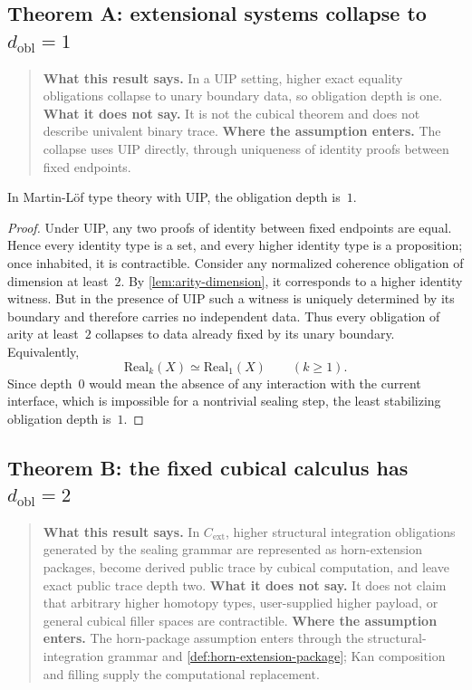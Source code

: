 \documentclass{lmcs}
\newcommand{\Real}{\mathrm{Real}}
\newcommand{\Cext}{C_{\mathrm{ext}}}
\begin{document}
\subsection{\texorpdfstring{Theorem A: extensional systems collapse to $d_{\mathrm{obl}}=1$}{Theorem A: extensional systems collapse to d obl = 1}}

\begin{quote}
\small
\textbf{What this result says.}
In a UIP setting, higher exact equality obligations collapse to unary
boundary data, so obligation depth is one.
\textbf{What it does not say.}
It is not the cubical theorem and does not describe univalent binary trace.
\textbf{Where the assumption enters.}
The collapse uses UIP directly, through uniqueness of identity proofs between
fixed endpoints.
\end{quote}

\begin{thm}
\label{thm:extensional}
In Martin-L\"of type theory with UIP, the obligation depth is~$1$.
\end{thm}

\begin{proof}
Under UIP, any two proofs of identity between fixed endpoints are equal. Hence every identity type is a set, and every higher identity type is a proposition; once inhabited, it is contractible. Consider any normalized coherence obligation of dimension at least~$2$. By \autoref{lem:arity-dimension}, it corresponds to a higher identity witness. But in the presence of UIP such a witness is uniquely determined by its boundary and therefore carries no independent data. Thus every obligation of arity at least~$2$ collapses to data already fixed by its unary boundary. Equivalently,
\[
  \Real_k(X) \simeq \Real_1(X)
  \qquad
  (k \geq 1).
\]
Since depth~$0$ would mean the absence of any interaction with the current interface, which is impossible for a nontrivial sealing step, the least stabilizing obligation depth is~$1$.
\end{proof}

\subsection{\texorpdfstring{Theorem B: the fixed cubical calculus has $d_{\mathrm{obl}}=2$}{Theorem B: the fixed cubical calculus has d obl = 2}}

\begin{quote}
\small
\textbf{What this result says.}
In $\Cext$, higher structural integration obligations generated by the sealing
grammar are represented as horn-extension packages, become derived public trace
by cubical computation, and leave exact public trace depth two.
\textbf{What it does not say.}
It does not claim that arbitrary higher homotopy types, user-supplied higher
payload, or general cubical filler spaces are contractible.
\textbf{Where the assumption enters.}
The horn-package assumption enters through the structural-integration grammar
and \autoref{def:horn-extension-package}; Kan composition and filling supply
the computational replacement.
\end{quote}
\end{document}
